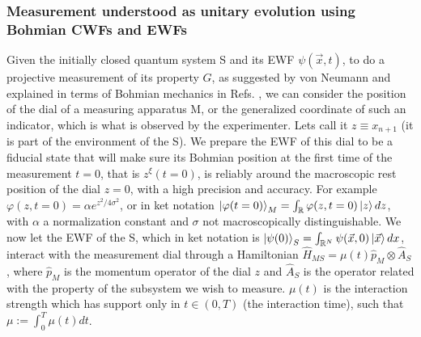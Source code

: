 \documentclass[11pt, a4paper]{article} %
\newcommand{\R}{\mathbb{R}} %
\begin{document}

\subsubsection*{Measurement understood as unitary evolution using Bohmian CWFs and EWFs}

Given the initially closed quantum system S and its EWF $\psi(\vec{x},t)$, to do a projective measurement of its property $G$, as suggested by von Neumann \cite{vonNeumann} and explained in terms of Bohmian mechanics in Refs. \cite{Durr, JordiXavier, Holland}, we can consider the position of the dial of a measuring apparatus M, or the generalized coordinate of such an indicator, which is what is observed by the experimenter. Lets call it $z\equiv x_{n+1}$ (it is part of the environment of the S). We prepare the EWF of this dial to be a fiducial state that will make sure its Bohmian position at the first time of the measurement $t=0$, that is $z^\xi(t=0)$, is reliably around the macroscopic rest position of the dial $z=0$, with a high precision and accuracy. For example $\varphi(z,t=0)=\alpha e^{z^2/4\sigma^2}$, or in ket notation $\ket{\varphi(t=0)}_M=\int_\R\varphi(z,t=0) \ket{z}dz$,  with $\alpha$ a normalization constant and $\sigma$ not macroscopically distinguishable. We now let the EWF of the S, which in ket notation is $\ket{\psi(0)}_S=\int_{\R^N}\psi(\vec{x},0)\ket{\vec{x}}dx$, interact with the measurement dial through a Hamiltonian $\hat{H}_{MS}=\mu(t)\hat{p}_M\otimes \hat{A}_S$, where $\hat{p}_M$ is the momentum operator of the dial $z$ and $\hat{A}_S$ is the operator related with the property of the subsystem we wish to measure. $\mu(t)$ is the interaction strength which has support only in $t\in(0,T)$ (the interaction time), such that $\mu:=\int_0^T\mu(t)dt$. 
\end{document}

